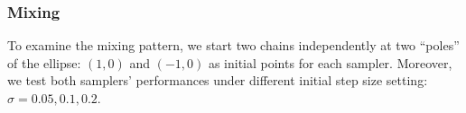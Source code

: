 \documentclass{article}
\begin{document}
\subsubsection{Mixing}
To examine the mixing pattern, we start two chains independently at two ``poles'' of the ellipse: $(1,0)$ and $(-1,0)$ as initial points for each sampler. Moreover, we test both samplers' performances under different initial step size setting: $\sigma = 0.05, 0.1, 0.2$.
\end{document}
